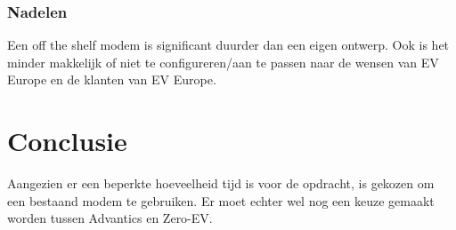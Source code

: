 \subsubsection{Nadelen}

Een off the shelf modem is significant duurder dan een eigen ontwerp. Ook is
het minder makkelijk of niet te configureren/aan te passen naar de wensen van
EV Europe en de klanten van EV Europe.

\section{Conclusie}

Aangezien er een beperkte hoeveelheid tijd is voor de opdracht, is gekozen om
een bestaand modem te gebruiken. Er moet echter wel nog een keuze gemaakt
worden tussen Advantics en Zero-EV.